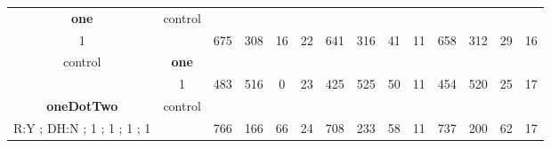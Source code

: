 \begin{table}[]
{\begin{tabular}{|c|c|c|c|c|c|c|c|c|c|c|c|c|c|}
\cellcolor{blue!15}\textbf{one} & control& {\color[HTML]{00009B} } & {\color[HTML]{9A0000} } & {\color[HTML]{009901} } &  & {\color[HTML]{00009B} } & {\color[HTML]{9A0000} } & {\color[HTML]{009901} } &  & {\color[HTML]{00009B} } & {\color[HTML]{9A0000} } & {\color[HTML]{009901} } &  \\ 
\cellcolor{ blue!15}1 &  & \multirow{-2}{*}{{\color[HTML]{00009B} 675}} & \multirow{-2}{*}{{\color[HTML]{9A0000} 308}} & \multirow{-2}{*}{{\color[HTML]{009901} 16}} & \multirow{-2}{*}{22} & \multirow{-2}{*}{{\color[HTML]{00009B} 641}} & \multirow{-2}{*}{{\color[HTML]{9A0000} 316}} & \multirow{-2}{*}{{\color[HTML]{009901} 41}} & \multirow{-2}{*}{11} & \multirow{-2}{*}{{\color[HTML]{00009B} 658}} & \multirow{-2}{*}{{\color[HTML]{9A0000} 312}} & \multirow{-2}{*}{{\color[HTML]{009901} 29}} & \multirow{-2}{*}{16} \\ \hline

control & \cellcolor{blue!15}\textbf{one}& {\color[HTML]{00009B} } & {\color[HTML]{9A0000} } & {\color[HTML]{009901} } &  & {\color[HTML]{00009B} } & {\color[HTML]{9A0000} } & {\color[HTML]{009901} } &  & {\color[HTML]{00009B} } & {\color[HTML]{9A0000} } & {\color[HTML]{009901} } &  \\ 
 & \cellcolor{ blue!15}1 & \multirow{-2}{*}{{\color[HTML]{00009B} 483}} & \multirow{-2}{*}{{\color[HTML]{9A0000} 516}} & \multirow{-2}{*}{{\color[HTML]{009901} 0}} & \multirow{-2}{*}{23} & \multirow{-2}{*}{{\color[HTML]{00009B} 425}} & \multirow{-2}{*}{{\color[HTML]{9A0000} 525}} & \multirow{-2}{*}{{\color[HTML]{009901} 50}} & \multirow{-2}{*}{11} & \multirow{-2}{*}{{\color[HTML]{00009B} 454}} & \multirow{-2}{*}{{\color[HTML]{9A0000} 520}} & \multirow{-2}{*}{{\color[HTML]{009901} 25}} & \multirow{-2}{*}{17} \\ \hline


\cellcolor{blue!15}\textbf{oneDotTwo} & control& {\color[HTML]{00009B} } & {\color[HTML]{9A0000} } & {\color[HTML]{009901} } &  & {\color[HTML]{00009B} } & {\color[HTML]{9A0000} } & {\color[HTML]{009901} } &  & {\color[HTML]{00009B} } & {\color[HTML]{9A0000} } & {\color[HTML]{009901} } &  \\ 
\cellcolor{ blue!15}R:Y ; DH:N ; 1 ; 1 ; 1 ; 1 &  & \multirow{-2}{*}{{\color[HTML]{00009B} 766}} & \multirow{-2}{*}{{\color[HTML]{9A0000} 166}} & \multirow{-2}{*}{{\color[HTML]{009901} 66}} & \multirow{-2}{*}{24} & \multirow{-2}{*}{{\color[HTML]{00009B} 708}} & \multirow{-2}{*}{{\color[HTML]{9A0000} 233}} & \multirow{-2}{*}{{\color[HTML]{009901} 58}} & \multirow{-2}{*}{11} & \multirow{-2}{*}{{\color[HTML]{00009B} 737}} & \multirow{-2}{*}{{\color[HTML]{9A0000} 200}} & \multirow{-2}{*}{{\color[HTML]{009901} 62}} & \multirow{-2}{*}{17} \\ \hline


\end{tabular}}
\end{table}

